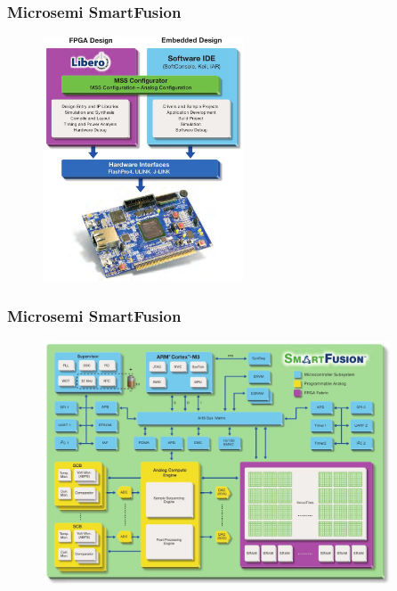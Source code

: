 \documentclass{beamer}
\begin{document}

\begin{frame} 
\frametitle{Microsemi SmartFusion}
  \begin{figure}[h]
  \includegraphics[width=0.53\textwidth]{images/designtools.jpeg}
  \end{figure}
\end{frame}


\begin{frame} 
\frametitle{Microsemi SmartFusion}
  \begin{figure}[h]
  \includegraphics[width=0.92\textwidth]{images/fusionblockdiagram.jpeg}
  \end{figure}
\end{frame}
\end{document}
